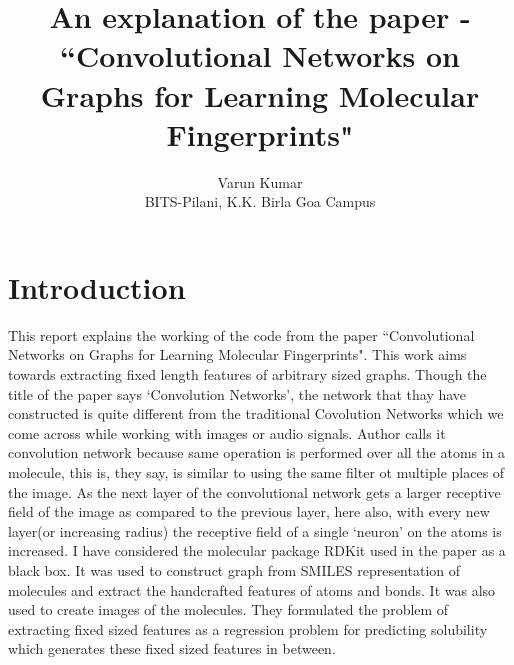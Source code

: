 \documentclass[10pt,a4paper,Times new roman]{report}
\begin{document}
\title{An explanation of the paper -\\``Convolutional Networks on Graphs
for Learning Molecular Fingerprints"}
\author{Varun Kumar\\ BITS-Pilani, K.K. Birla Goa Campus}
\maketitle
\tableofcontents
\pagebreak

\section{Introduction}
This report explains the working of the code from the paper ``Convolutional Networks on Graphs for Learning Molecular Fingerprints". This work aims towards extracting fixed length features of arbitrary sized graphs. Though the title of the paper says `Convolution Networks', the network that thay have constructed is quite different from the traditional Covolution Networks which we come across while working with images or audio signals. Author calls it convolution network because same operation is performed over all the atoms in a molecule, this is, they say, is similar to using the same filter ot multiple places of the image. As the next layer of the convolutional network gets a larger receptive field of the image as compared to the previous layer, here also, with every new layer(or increasing radius) the receptive field of a single `neuron' on the atoms is increased. I have considered the molecular package RDKit used in the paper as a black box. It was used to construct graph from SMILES representation of molecules and extract the handcrafted features of atoms and bonds. It was also used to create images of the molecules. They formulated the problem of extracting fixed sized features as a regression problem for predicting solubility which generates these fixed sized features in between.
\end{document}
